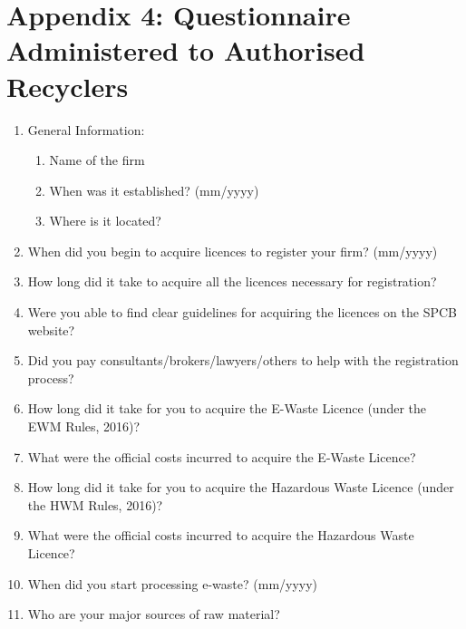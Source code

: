 \documentclass[a4paper, 12pt]{article}
\begin{document}
             \section*{Appendix 4: Questionnaire Administered to Authorised Recyclers}
                    \begin{mdframed}[backgroundcolor=gray!20]
                    \begin{enumerate}
                       \item General Information:
                          \begin{enumerate}[noitemsep]
                          	 \item Name of the firm
                    	  \item When was it established? (mm/yyyy)
                    	   \item Where is it located?
                       \end{enumerate}
                       \item When did you begin to acquire licences to register your firm? (mm/yyyy)
                       \item How long did it take to acquire all the licences necessary for registration?
                       \item Were you able to find clear guidelines for acquiring the licences on the SPCB website? 
                       \item Did you pay consultants/brokers/lawyers/others to help with the registration process? 
                       \item How long did it take for you to acquire the E-Waste Licence (under the EWM Rules, 2016)?
                       \item What were the official costs incurred to acquire the E-Waste Licence?
                       \item How long did it take for you to acquire the Hazardous Waste Licence (under the HWM Rules, 2016)? 
                        \item What were the official costs incurred to acquire the Hazardous Waste Licence? 
                        \item When did you start processing e-waste? (mm/yyyy) 
                        \item Who are your major sources of raw material?
                        \begin{enumerate}[noitemsep]

\end{enumerate}
\end{enumerate}
\end{mdframed}
\end{document}
